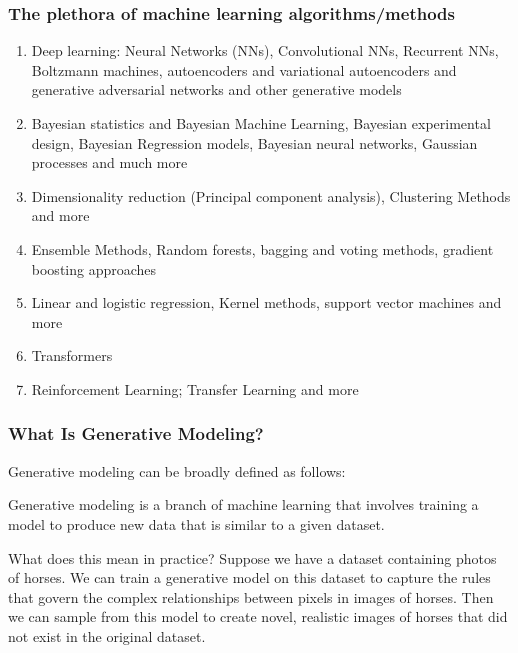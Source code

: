 \documentclass{beamer}
\begin{document}
\begin{frame}
\frametitle{The plethora  of machine learning algorithms/methods}

\begin{enumerate}
\item Deep learning: Neural Networks (NNs), Convolutional NNs, Recurrent NNs, Boltzmann machines, autoencoders and variational autoencoders  and generative adversarial networks and other generative models 

\item Bayesian statistics and Bayesian Machine Learning, Bayesian experimental design, Bayesian Regression models, Bayesian neural networks, Gaussian processes and much more

\item Dimensionality reduction (Principal component analysis), Clustering Methods and more

\item Ensemble Methods, Random forests, bagging and voting methods, gradient boosting approaches 

\item Linear and logistic regression, Kernel methods, support vector machines and more

\item Transformers

\item Reinforcement Learning; Transfer Learning and more 
\end{enumerate}

\noindent
\end{frame}

\begin{frame}
\frametitle{What Is Generative Modeling?}

Generative modeling can be broadly defined as follows:

Generative modeling is a branch of machine learning that involves
training a model to produce new data that is similar to a given
dataset.

What does this mean in practice? Suppose we have a dataset containing
photos of horses. We can train a generative model on this dataset to
capture the rules that govern the complex relationships between pixels
in images of horses. Then we can sample from this model to create
novel, realistic images of horses that did not exist in the original
dataset.
\end{frame}
\end{document}
